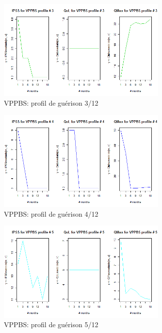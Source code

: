 \begin{figure}[H]
\centering
\includegraphics[width=0.75\textwidth]{../Fig/VPPBS/vppbs-profil-post-03.png}
\caption{VPPBS: profil de guérison 3/12}
\end{figure}

\begin{figure}[H]
\centering
\includegraphics[width=0.75\textwidth]{../Fig/VPPBS/vppbs-profil-post-04.png}
\caption{VPPBS: profil de guérison 4/12}
\end{figure}

\begin{figure}[H]
\centering
\includegraphics[width=0.75\textwidth]{../Fig/VPPBS/vppbs-profil-post-05.png}
\caption{VPPBS: profil de guérison 5/12}
\end{figure}


